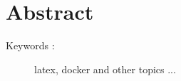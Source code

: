  \blankpage
 \chapter*{Abstract}
\label{chap:Abstract}

\lipsum[1-2]

\begin{description}\item [Keywords :]latex, docker and other topics ...
\end{description}



